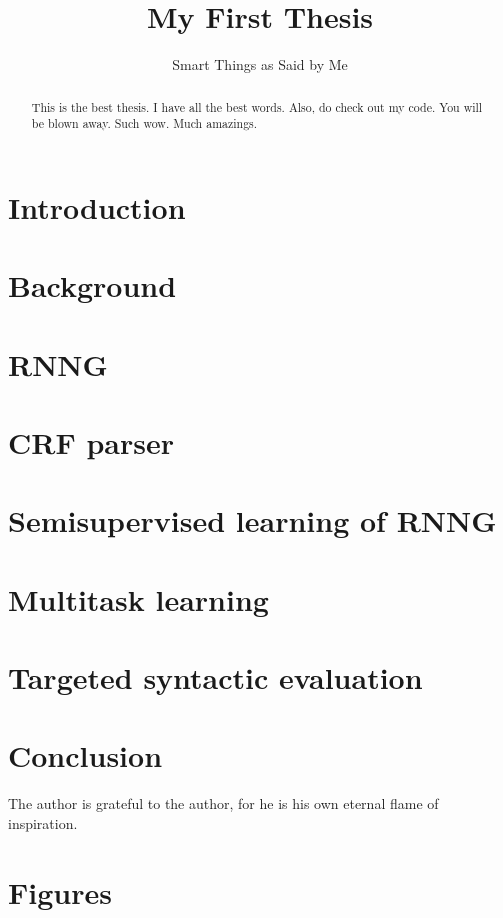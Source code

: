 \documentclass[examplefnt,biber]{../src/nowfnt} %
\title{My First Thesis}
\subtitle{Smart Things as Said by Me}
\begin{document}
\makeabstracttitle

\begin{abstract}
This is the best thesis. I have all the best words. Also, do check out my code. You will be blown away. Such wow. Much amazings.

\end{abstract}


\chapter{Introduction}
\label{01-introduction}



\chapter{Background}
\label{02-background}



\chapter{RNNG}
\label{03-rnng}



\chapter{CRF parser}
\label{04-crf}



\chapter{Semisupervised learning of RNNG}
\label{05-semisupervised}



\chapter{Multitask learning}
\label{06-multitask}



\chapter{Targeted syntactic evaluation}
\label{07-syneval}



\chapter{Conclusion}
\label{08-conclusion}




\begin{acknowledgements}
The author is grateful to the author, for he is his own eternal flame of inspiration.
\end{acknowledgements}

\appendix
\chapter{Figures}
\label{A1-figures}


\backmatter  %

\printbibliography
\end{document}
